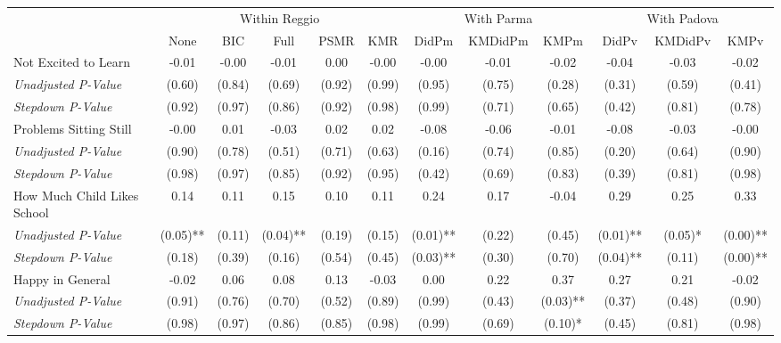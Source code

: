 \begin{tabular}{l c c c c c c c c c c c}
\toprule
& \multicolumn{5}{c}{Within Reggio} & \multicolumn{3}{c}{With Parma} & \multicolumn{3}{c}{With Padova} \\\cmidrule(lr){2-6} \cmidrule(lr){7-9} \cmidrule(lr){10-12}
 & None & BIC & Full & PSMR & KMR & DidPm & KMDidPm & KMPm & DidPv & KMDidPv & KMPv \\
\midrule
Not Excited to Learn & -0.01 & -0.00 & -0.01 & 0.00 & -0.00 & -0.00 & -0.01 & -0.02 & -0.04 & -0.03 & -0.02 \\
\quad \textit{Unadjusted P-Value} & (0.60) & (0.84) & (0.69) & (0.92) & (0.99) & (0.95) & (0.75) & (0.28) & (0.31) & (0.59) & (0.41) \\
\quad \textit{Stepdown P-Value} & (0.92) & (0.97) & (0.86) & (0.92) & (0.98) & (0.99) & (0.71) & (0.65) & (0.42) & (0.81) & (0.78) \\
Problems Sitting Still & -0.00 & 0.01 & -0.03 & 0.02 & 0.02 & -0.08 & -0.06 & -0.01 & -0.08 & -0.03 & -0.00 \\
\quad \textit{Unadjusted P-Value} & (0.90) & (0.78) & (0.51) & (0.71) & (0.63) & (0.16) & (0.74) & (0.85) & (0.20) & (0.64) & (0.90) \\
\quad \textit{Stepdown P-Value} & (0.98) & (0.97) & (0.85) & (0.92) & (0.95) & (0.42) & (0.69) & (0.83) & (0.39) & (0.81) & (0.98) \\
How Much Child Likes School & 0.14 & 0.11 & 0.15 & 0.10 & 0.11 & 0.24 & 0.17 & -0.04 & 0.29 & 0.25 & 0.33 \\
\quad \textit{Unadjusted P-Value} & (0.05)** & (0.11) & (0.04)** & (0.19) & (0.15) & (0.01)** & (0.22) & (0.45) & (0.01)** & (0.05)* & (0.00)** \\
\quad \textit{Stepdown P-Value} & (0.18) & (0.39) & (0.16) & (0.54) & (0.45) & (0.03)** & (0.30) & (0.70) & (0.04)** & (0.11) & (0.00)** \\
Happy in General & -0.02 & 0.06 & 0.08 & 0.13 & -0.03 & 0.00 & 0.22 & 0.37 & 0.27 & 0.21 & -0.02 \\
\quad \textit{Unadjusted P-Value} & (0.91) & (0.76) & (0.70) & (0.52) & (0.89) & (0.99) & (0.43) & (0.03)** & (0.37) & (0.48) & (0.90) \\
\quad \textit{Stepdown P-Value} & (0.98) & (0.97) & (0.86) & (0.85) & (0.98) & (0.99) & (0.69) & (0.10)* & (0.45) & (0.81) & (0.98) \\
\bottomrule
\end{tabular}
